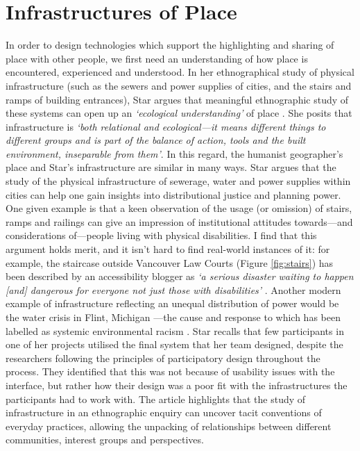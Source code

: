 \section{Infrastructures of Place}
\label{sec:InfrastructuresOfPlace}
In order to design technologies which support the highlighting and sharing of place with other people, we first need an understanding of how place is encountered, experienced and understood. In her ethnographical study of physical infrastructure (such as the sewers and power supplies of cities, and the stairs and ramps of building entrances), Star argues that meaningful ethnographic study of these systems can open up an \textit{`ecological understanding'} of place \citep{Star1999}. She posits that infrastructure is \textit{`both relational and ecological---it means different things to different groups and is part of the balance of action, tools and the built environment, inseparable from them'}. In this regard, the humanist geographer's place and Star's infrastructure are similar in many ways. Star argues that the study of the physical infrastructure of sewerage, water and power supplies within cities can help one gain insights into distributional justice and planning power. One given example is that a keen observation of the usage (or omission) of stairs, ramps and railings can give an impression of institutional attitudes towards---and considerations of---people living with physical disabilities. I find that this argument holds merit, and it isn't hard to find real-world instances of it: for example, the staircase outside Vancouver Law Courts (Figure \ref{fig:stairs}) has been described by an accessibility blogger as \textit{`a serious disaster waiting to happen [and] dangerous for everyone not just those with disabilities'} \citep{Wheeler-Hall2017}. Another modern example of infrastructure reflecting an unequal distribution of power would be the water crisis in Flint, Michigan \citep{Clark2018}---the cause and response to which has been labelled as systemic environmental racism \citep{MichiganCivilRightsCommission2017a}. Star recalls that few participants in one of her projects utilised the final system that her team designed, despite the researchers following the principles of participatory design throughout the process. They identified that this was not because of usability issues with the interface, but rather how their design was a poor fit with the infrastructures the participants had to work with. The article highlights that the study of infrastructure in an ethnographic enquiry can uncover tacit conventions of everyday practices, allowing the unpacking of relationships between different communities, interest groups and perspectives.

